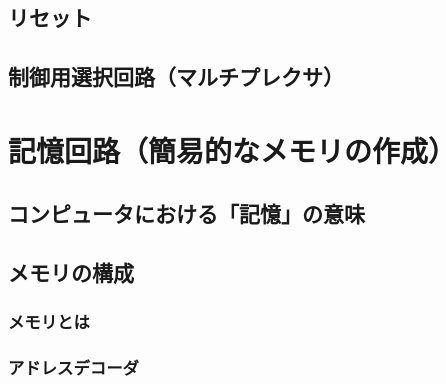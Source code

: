     \subsection{リセット}

    \subsection{制御用選択回路（マルチプレクサ）}

    \section{記憶回路（簡易的なメモリの作成）}
    \subsection{コンピュータにおける「記憶」の意味}

    \subsection{メモリの構成}
        \subsubsection{メモリとは}

        \subsubsection{アドレスデコーダ}

